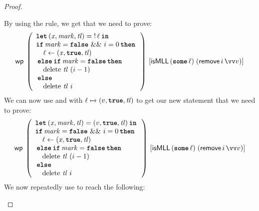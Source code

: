 \documentclass[thesis.tex]{subfiles}
\begin{document}
\begin{proof}
\begin{description}
              By using the  rule, we get that we need to prove:
              \[\wpre{
                      \left(
                      \begin{array}{l}
                              \Let (\lvar, \langv{mark}, \tl) = \deref \loc in  \\
                              \If \langv{mark} = \False\ \&\&\ \iindex = 0 then \\
                              \quad \loc \gets (\lvar, \True, \tl)              \\
                              \Else \If \langv{mark} = \False then              \\
                              \quad \MLLdelete\,\tl\ (\iindex - 1)              \\
                              \Else                                             \\
                              \quad \MLLdelete\,\tl\ \iindex
                          \end{array}
                      \right)
                  }{\isMLL\, (\Some \loc)\; (\textlog{remove}\, \iindex\, \vect{v})}\]
              We can now use  and  with $\loc \fmapsto (\val, \True, \tl)$ to get our new statement that we need to prove:
              \[
                  \wpre{\left(
                      \begin{array}{l}
                              \Let (\lvar, \langv{mark}, \tl) = (\val, \True, \tl) in \\
                              \If \langv{mark} = \False\ \&\&\ \iindex = 0 then       \\
                              \quad \loc \gets (\lvar, \True, \tl)                    \\
                              \Else \If \langv{mark} = \False then                    \\
                              \quad \MLLdelete\,\tl\ (\iindex - 1)                    \\
                              \Else                                                   \\
                              \quad \MLLdelete\,\tl\ \iindex
                          \end{array}
                      \right)}{\isMLL\, (\Some \loc)\; (\textlog{remove}\, \iindex\, \vect{v})}
              \]
              We now repeatedly use  to reach the following:
              \[
\]
\end{description}
\end{proof}
\end{document}
